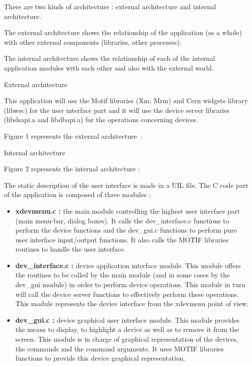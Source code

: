 %
%
%
%
%
%
%
%
%
%
There are two kinds of architecture : external architecture and internal
architecture.

The external architecture shows the relationship of the application (as a whole)
with other external components (libraries, other processes).

The internal architecture shows the relationship of each of the internal
application modules with each other and also with the external world.

	{External architecture}

This application will use the Motif libraries (Xm, Mrm) and Cern widgets
library (libwsc) for the user interface part and it will use the device server
libraries (libdsapi.a and libdbapi.a) for the operations concerning devices.

Figure 1 represents the external architecture~:




	{Internal architecture}

Figure 2 represents the internal architecture :



The static description of the user interface is made in a UIL file. The C code
part of the application is composed of three modules :
\begin{itemize}
\item
{\bf xdevmenu.c : } the main module controlling the highest user interface part
(main menu-bar, dialog boxes). It calls the dev\_interface.c functions to
perform the device functions and the dev\_gui.c functions to perform pure user
interface input/output functions. It also calls the MOTIF libraries routines to
handle the user interface.
\item
{\bf dev\_interface.c : } device application interface module. This module
offers the routines to be called by the main module (and in some cases by the
dev\_gui module) in order to perform device operations.
This module in turn will call the device server functions to effectively 
perform these operations. This module represents the device
interface from the xdevmenu point of view.
\item
{\bf dev\_gui.c : } device graphical user interface module. This module provides
the means to display, to highlight a device as well as to remove it from the
screen. This module is in charge of graphical representation of the devices,
the commands and the command arguments.
It uses MOTIF libraries functions to provide this device graphical
representation.
\end{itemize}


